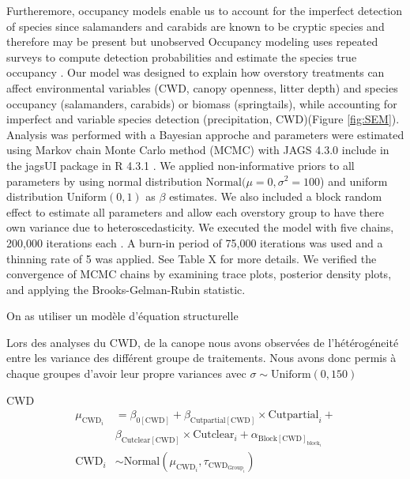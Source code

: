 Furtheremore, occupancy models enable us to account for the imperfect detection of species since salamanders and carabids are known to be cryptic species and therefore may be present but unobserved \citep{baileyEstimatingSiteOccupancy2004,spiersEstimatingSpeciesMisclassification2022}
Occupancy modeling uses repeated surveys to compute detection probabilities and estimate the species true occupancy \citep{mackenzieEstimatingSiteOccupancy2002,mazerolleMakingGreatLeaps2007}.
Our model was designed to explain how overstory treatments can affect environmental variables (CWD, canopy openness, litter depth) 
and species occupancy (salamanders, carabids) or biomass (springtails), while accounting for imperfect and variable species detection (precipitation, CWD)(Figure \ref*{fig:SEM}).
Analysis was performed with a Bayesian approche and parameters were estimated using Markov chain Monte Carlo method (MCMC) with JAGS 4.3.0 include in the jagsUI package in R 4.3.1 \citep{lunnBUGSProjectEvolution2009,kellnerJagsUIWrapperRjags2024,rcoreteamLanguageEnvironmentStatistical2020}.
We applied non-informative priors to all parameters by using normal distribution $\text{Normal}(\mu = 0, \sigma^2 = 100$) and uniform distribution $\text{Uniform}(0,1)$ as $\beta$ estimates. 
We also included a block random effect to estimate all parameters and allow each overstory group to have there own variance due to heteroscedasticity. 
We executed the model with five chains, 200,000 iterations each \citep{gelmanUnderstandingPredictiveInformation2014}. A burn-in period of 75,000 iterations was used and a thinning rate of 5 was applied. See Table X for more details.
We verified the convergence of MCMC chains by examining trace plots, posterior density plots, and applying the Brooks-Gelman-Rubin statistic.

On as utiliser un modèle d'équation structurelle 

Lors des analyses du CWD, de la canope nous avons observées de l'hétérogéneité entre les variance des différent groupe de traitements. 
Nous avons donc permis à chaque groupes d'avoir leur propre variances avec $\sigma \sim \text{Uniform}(0,150)$


CWD \\

\begin{align}
  \mu_{\text{CWD}_i} &= 
  \beta_{0[\text{CWD}]} + \beta_{\text{Cutpartial}[\text{CWD}]} \times \text{Cutpartial}_{i} + \nonumber\\
  & \beta_{\text{Cutclear}[\text{CWD}]} \times \text{Cutclear}_{i} + \alpha_{\text{Block}[\text{CWD}]_{\text{block}_i}} \\
  \text{CWD}_{i} &\sim 
  \text{Normal} (\mu_{\text{CWD}_i}, \tau_{\text{CWD}_{\text{Group}_i}}) \nonumber 
\end{align}

